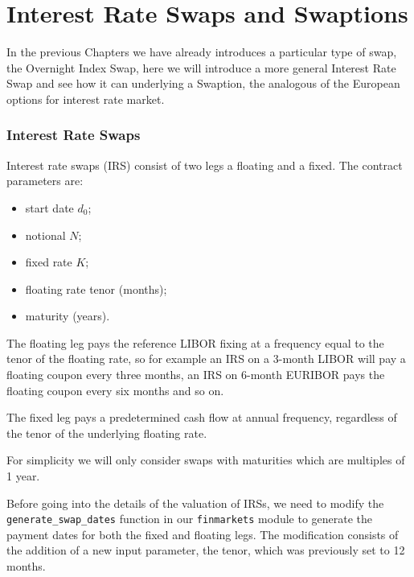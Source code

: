 \chapter{Interest Rate Swaps and Swaptions}\label{interest-rate-swaps-and-swaptions}

In the previous Chapters we have already introduces a particular type of swap, the Overnight Index Swap, here we will introduce a more general Interest Rate Swap and see how it can underlying a Swaption, the analogous of the European options for interest rate market.

\subsection{Interest Rate Swaps}\label{interest-rate-swaps}

Interest rate swaps (IRS) consist of two legs a floating and a fixed. The
contract parameters are:

\begin{itemize}
\tightlist
\item
  start date \(d_0\);
\item
  notional \(N\);
\item
  fixed rate \(K\);
\item
  floating rate tenor (months);
\item
  maturity (years).
\end{itemize}

The floating leg pays the reference LIBOR fixing at a frequency equal to
the tenor of the floating rate, so for example an IRS on a 3-month
LIBOR will pay a floating coupon every three months, an IRS on 6-month
EURIBOR pays the floating coupon every six months and so on.

The fixed leg pays a predetermined cash flow at annual frequency,
regardless of the tenor of the underlying floating rate. 

For simplicity we will only consider swaps with maturities which are multiples of 1
year.

Before going into the details of the valuation of IRSs, we need to
modify the \texttt{generate\_swap\_dates} function in our
\texttt{finmarkets} module to generate the payment dates for both the
fixed and floating legs. The modification consists of the addition of a new input
parameter, the tenor, which was previously set to 12 months.

